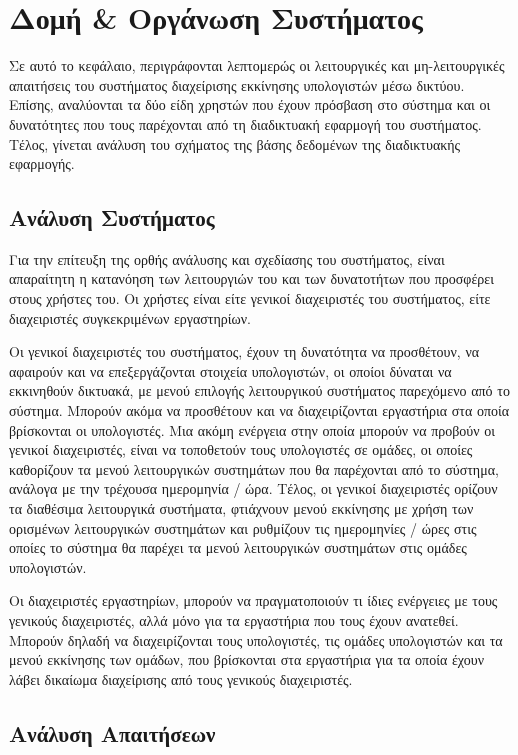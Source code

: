 \chapter{Δομή \& Οργάνωση Συστήματος}
Σε αυτό το κεφάλαιο, περιγράφονται λεπτομερώς οι λειτουργικές και μη-λειτουργικές απαιτήσεις του συστήματος διαχείρισης εκκίνησης υπολογιστών μέσω δικτύου. Επίσης, αναλύονται τα δύο είδη χρηστών που έχουν πρόσβαση στο σύστημα και οι δυνατότητες που τους παρέχονται από τη διαδικτυακή εφαρμογή του συστήματος. Τέλος, γίνεται ανάλυση του σχήματος της βάσης δεδομένων της διαδικτυακής εφαρμογής.

\section{Ανάλυση Συστήματος}
Για την επίτευξη της ορθής ανάλυσης και σχεδίασης του συστήματος, είναι απαραίτητη η κατανόηση των λειτουργιών του και των δυνατοτήτων που προσφέρει στους χρήστες του. Οι χρήστες είναι είτε γενικοί διαχειριστές του συστήματος, είτε διαχειριστές συγκεκριμένων εργαστηρίων.

Οι γενικοί διαχειριστές του συστήματος, έχουν τη δυνατότητα να προσθέτουν, να αφαιρούν και να επεξεργάζονται στοιχεία υπολογιστών, οι οποίοι δύναται να εκκινηθούν δικτυακά, με μενού επιλογής λειτουργικού συστήματος παρεχόμενο από το σύστημα. Μπορούν ακόμα να προσθέτουν και να διαχειρίζονται εργαστήρια στα οποία βρίσκονται οι υπολογιστές. Μια ακόμη ενέργεια στην οποία μπορούν να προβούν οι γενικοί διαχειριστές, είναι να τοποθετούν τους υπολογιστές σε ομάδες, οι οποίες καθορίζουν τα μενού λειτουργικών συστημάτων που θα παρέχονται από το σύστημα, ανάλογα με την τρέχουσα ημερομηνία / ώρα. Τέλος, οι γενικοί διαχειριστές ορίζουν τα διαθέσιμα λειτουργικά συστήματα, φτιάχνουν μενού εκκίνησης με χρήση των ορισμένων λειτουργικών συστημάτων και ρυθμίζουν τις ημερομηνίες / ώρες στις οποίες το σύστημα θα παρέχει τα μενού λειτουργικών συστημάτων στις ομάδες υπολογιστών.

Οι διαχειριστές εργαστηρίων, μπορούν να πραγματοποιούν τι ίδιες ενέργειες με τους γενικούς διαχειριστές, αλλά μόνο για τα εργαστήρια που τους έχουν ανατεθεί. Μπορούν δηλαδή να διαχειρίζονται τους υπολογιστές, τις ομάδες υπολογιστών και τα μενού εκκίνησης των ομάδων, που βρίσκονται στα εργαστήρια για τα οποία έχουν λάβει δικαίωμα διαχείρισης από τους γενικούς διαχειριστές.
 
\section{Ανάλυση Απαιτήσεων}

